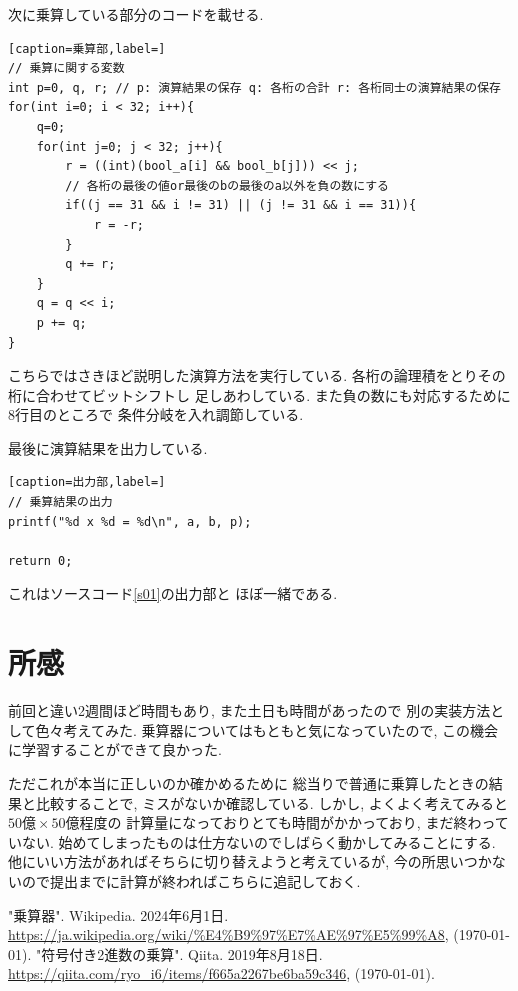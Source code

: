 \documentclass[a4paper, xelatex, ja=standard]{bxjsarticle}
\begin{document}
次に乗算している部分のコードを載せる.
\begin{lstlisting}[caption=乗算部,label=]
// 乗算に関する変数
int p=0, q, r; // p: 演算結果の保存 q: 各桁の合計 r: 各桁同士の演算結果の保存
for(int i=0; i < 32; i++){
	q=0;
	for(int j=0; j < 32; j++){
		r = ((int)(bool_a[i] && bool_b[j])) << j;
		// 各桁の最後の値or最後のbの最後のa以外を負の数にする
		if((j == 31 && i != 31) || (j != 31 && i == 31)){
			r = -r;
		}
		q += r;
	}
	q = q << i;
	p += q;
}
\end{lstlisting}
こちらではさきほど説明した演算方法を実行している.
各桁の論理積をとりその桁に合わせてビットシフトし
足しあわしている.
また負の数にも対応するために8行目のところで
条件分岐を入れ調節している.

最後に演算結果を出力している.
\begin{lstlisting}[caption=出力部,label=]
// 乗算結果の出力
printf("%d x %d = %d\n", a, b, p);

return 0;
\end{lstlisting}
これはソースコード\ref{s01}の出力部と
ほぼ一緒である.

\section{所感}
前回と違い2週間ほど時間もあり,
また土日も時間があったので
別の実装方法として色々考えてみた.
乗算器についてはもともと気になっていたので,
この機会に学習することができて良かった.

ただこれが本当に正しいのか確かめるために
総当りで普通に乗算したときの結果と比較することで,
ミスがないか確認している.
しかし, よくよく考えてみると$50\mbox{億}\times50\mbox{億}$程度の
計算量になっておりとても時間がかかっており, まだ終わっていない.
始めてしまったものは仕方ないのでしばらく動かしてみることにする.
他にいい方法があればそちらに切り替えようと考えているが,
今の所思いつかないので提出までに計算が終わればこちらに追記しておく.

\begin{thebibliography}{9}
 "乗算器". Wikipedia. 2024年6月1日. \url{https://ja.wikipedia.org/wiki/%E4%B9%97%E7%AE%97%E5%99%A8}, (\today).
 "符号付き2進数の乗算". Qiita. 2019年8月18日. \url{https://qiita.com/ryo_i6/items/f665a2267be6ba59c346}, (\today).
\end{thebibliography}
\end{document}
